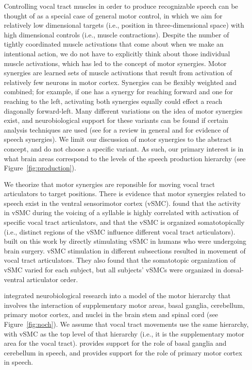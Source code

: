 Controlling vocal tract muscles
in order to produce recognizable speech
can be thought of as a special case of
general motor control,
in which we aim for relatively
low dimensional targets
(i.e., position in three-dimensional space)
with high dimensional controls
(i.e., muscle contractions).
Despite the number of tightly coordinated
muscle activations that come about
when we make an intentional action,
we do not have to explicitly
think about those individual muscle activations,
which has led to the concept
of motor synergies.
Motor synergies are learned sets of
muscle activations that result
from activation of relatively few
neurons in motor cortex.
Synergies can be flexibly weighted
and combined;
for example, if one has a synergy
for reaching forward and one for
reaching to the left,
activating both synergies
equally could effect
a reach diagonally forward-left.
Many different variations
on the idea of motor synergies exist,
and neurobiological support
for these variants
can be found if certain
analysis techniques are used
(see \citet{tresch2009}
for a review in general
and \citet{smith2004,smith2006}
for evidence of speech synergies).
We limit our discussion
of motor synergies to the abstract concept,
and do not choose a specific variant.
As such, our primary interest
is in what brain areas correspond
to the levels of the speech production hierarchy
(see Figure~\ref{fig:production}).

We theorize that motor synergies
are reponsible
for moving vocal tract articulators
to target positions.
There is evidence that motor synergies
related to speech
exist in the ventral sensorimotor cortex (vSMC).
\citet{bouchard2013} found that the activity
in vSMC during the voicing of a syllable
is highly correlated with
activation of specific vocal tract articulators,
and that the vSMC is organized somatotopically
(i.e., distinct regions of the vSMC
influence different vocal tract articulators).
\citet{breshears2015} built on this work
by directly stimulating vSMC in humans
who were undergoing brain surgery.
vSMC stimulation in different subsections
resulted in movement of vocal tract articulators.
They also found that the somatotopic organization
of vSMC varied for each subject,
but all subjects' vSMCs were organized
in dorsal-ventral articulator order.

\citet{dewolf2010} integrated neurobiological research
into a model of the motor hierarchy
that involves the interaction of
supplementary motor areas,
basal ganglia, cerebellum,
primary motor cortex,
and nuclei in the brain stem and spinal cord
(see Figure~\ref{fig:noch}).
We assume that vocal tract movements
use the same hierarchy,
with vSMC as the top level of that hierarchy
(i.e., it is the supplementary motor area
for the vocal tract).
\citet{wildgruber2001} provides support
for the role of basal ganglia
and cerebellum in speech,
and \citet{brown2009}
provides support for
the role of primary motor cortex
in speech.

